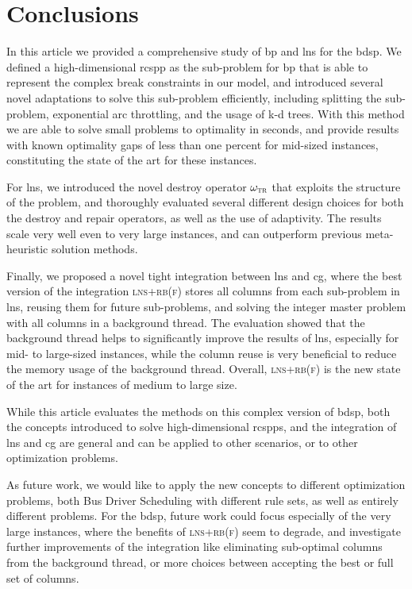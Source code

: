 \documentclass[]{amsart}
\newcommand{\tr}{$\omega_\textsc{tr}$\xspace}
\newcommand{\lnsrbf}{\textsc{lns+rb(f)}\xspace}
\theoremstyle{plain}
\begin{document}
\section{Conclusions}\label{sec:conclusion}

In this article we provided a comprehensive study of \acrfull{bp} and \acrfull{lns} for the \acrfull{bdsp}. We defined a high-dimensional \acrfull{rcspp} as the sub-problem for \gls{bp} that is able to represent the complex break constraints in our model, and introduced several novel adaptations to solve this sub-problem efficiently, including splitting the sub-problem, exponential arc throttling, and the usage of k-d trees. With this method we are able to solve small problems to optimality in seconds, and provide results with known optimality gaps of less than one percent for mid-sized instances, constituting the state of the art for these instances.

For \gls{lns}, we introduced the novel destroy operator \tr that exploits the structure of the problem, and thoroughly evaluated several different design choices for both the destroy and repair operators, as well as the use of adaptivity. The results scale very well even to very large instances, and can outperform previous meta-heuristic solution methods.

Finally, we proposed a novel tight integration between \gls{lns} and \acrfull{cg}, where the best version of the integration \lnsrbf stores all columns from each sub-problem in \gls{lns}, reusing them for future sub-problems, and solving the integer master problem with all columns in a background thread. The evaluation showed that the background thread helps to significantly improve the results of \gls{lns}, especially for mid- to large-sized instances, while the column reuse is very beneficial to reduce the memory usage of the background thread. Overall, \lnsrbf is the new state of the art for instances of medium to large size.

While this article evaluates the methods on this complex version of \gls{bdsp}, both the concepts introduced to solve high-dimensional \glspl{rcspp}, and the integration of \gls{lns} and \gls{cg} are general and can be applied to other scenarios, or to other optimization problems.

As future work, we would like to apply the new concepts to different optimization problems, both Bus Driver Scheduling with different rule sets, as well as entirely different problems. For the \gls{bdsp}, future work could focus especially of the very large instances, where the benefits of \lnsrbf seem to degrade, and investigate further improvements of the integration like eliminating sub-optimal columns from the background thread, or more choices between accepting the best or full set of columns.
\end{document}
